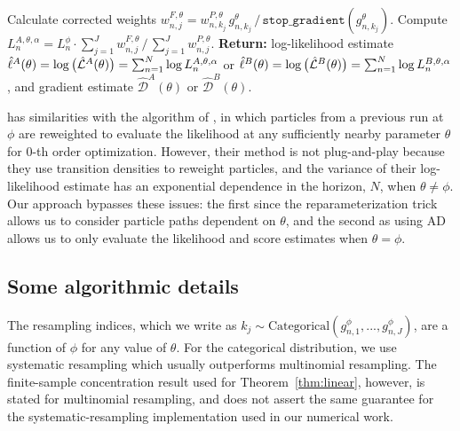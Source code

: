 \begin{algorithm}[htbp!]
            \hspace*{4mm} Calculate corrected weights
            $w_{n,j}^{F,\theta}= w^{P,\theta}_{n,k_j} \, g^{\theta}_{n,k_j} \, \big/ \, { \mathtt{stop\_gradient}(g^{\theta}_{n,k_j})}$.\newline
            \hspace*{4mm} Compute $ L_n^{A,\theta,\alpha} = L_n^\phi\cdot {\sum_{j=1}^J w^{F,\theta}_{n,j}} \, \big/ \, {\sum_{j=1}^J  w^{P,\theta}_{n,j}}$.\newline
	    \textbf{Return:} log-likelihood estimate $\hat{\ell}^A(\theta)= \log\big(\hat{\mathcal{L}}^A(\theta)\big) = \sum_{n=1}^N \log L_n^{A,\theta,\alpha}$ or $\hat{\ell}^B(\theta)=\log\big(\hat{\mathcal{L}}^B(\theta)\big) = \sum_{n=1}^N \log L_n^{B,\theta,\alpha}$, and gradient estimate $\hat{\mathcal{D}}^A(\theta)$ or $\hat{\mathcal{D}}^B(\theta)$.
\end{algorithm}

 has similarities with the algorithm of \cite{svensson18}, in which particles from a previous run at $\phi$ are reweighted to evaluate the likelihood at any sufficiently nearby parameter $\theta$ for $0$-th order optimization.
However, their method is not plug-and-play because they use transition densities to reweight particles, and the variance of their log-likelihood estimate has an exponential dependence in the horizon, $N$, when $\theta\neq\phi$.
Our approach bypasses these issues: the first since the reparameterization trick allows us to consider particle paths dependent on $\theta$, and the second as using AD allows us to only evaluate the likelihood and score estimates when $\theta=\phi$. 

\subsection{Some algorithmic details}

The resampling indices, which we write as $k_j \sim \text{Categorical}(g^{\phi}_{n,1},...,g^{\phi}_{n,J})$, are a function of $\phi$ for any value of $\theta$.
For the categorical distribution, we use systematic resampling \citep{arulampalam02,king16} which usually outperforms multinomial resampling.
The finite-sample concentration result used for Theorem~\ref{thm:linear},
however, is stated for multinomial resampling, and does not assert the same
guarantee for the systematic-resampling implementation used in our numerical
work.

